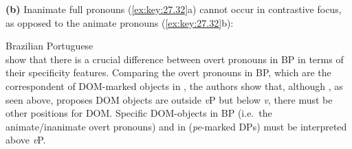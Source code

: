\documentclass[output=paper]{langsci/langscibook}
\begin{document}
\noindent\textbf{(b)} Inanimate full pronouns (\ref{ex:key:27.32}a) cannot  occur
in contrastive focus, as opposed to the animate pronouns (\ref{ex:key:27.32}b):

\ea\label{ex:key:27.32} Brazilian Portuguese\\
    \z
\z
\textcite{IrimiaCyrino2015,IrimiaCyrino2017} show that there is a crucial
difference between overt pronouns in \gls{BP} in terms of their specificity features.
Comparing the overt pronouns in \gls{BP}, which are the correspondent of DOM-marked
objects in , the authors show that, although \textcite{Lopez2012}, as
seen above, proposes DOM objects are outside \emph{v}P but below \emph{v},
there must be other positions for DOM\@. Specific DOM-objects in \gls{BP} (i.e.\ the
animate/inanimate overt pronouns) and in  (\emph{pe}-marked DPs) must
be interpreted above \emph{v}P.
\end{document}
